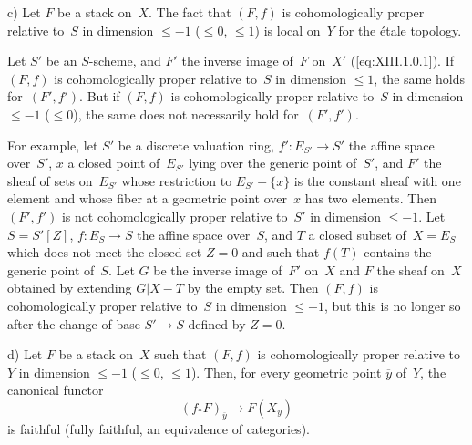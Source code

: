 \begin{remarks}
c) Let $F$ be a stack on~$X$. The fact that $(F,f)$ is
cohomologically proper relative to~$S$ in dimension
$\leqslant -1$ (\resp $\leqslant 0$, \resp $\leqslant 1$) is local
on~$Y$ for the \'etale topology.

Let $S'$ be an $S$-scheme, and $F'$ the inverse image of~$F$ on~$X'$
(\cf \eqref{eq:XIII.1.0.1}). If $(F,f)$ is cohomologically proper
relative to~$S$ in dimension $\leqslant 1$, the same holds
for~$(F', f')$. But if $(F,f)$ is cohomologically proper
relative to~$S$ in dimension $\leqslant -1$ (\resp $\leqslant
0$), the same does not necessarily hold for~$(F', f')$.

For example, let $S'$ be a discrete valuation ring, $f' \colon
E_{S'} \to S'$ the affine space over~$S'$, $x$ a closed
point of~$E_{S'}$ lying over the generic point of~$S'$, and
$F'$ the sheaf of sets on~$E_{S'}$ whose restriction to
$E_{S'}-\{x\}$ is the constant sheaf with one element and
whose fiber at a geometric point over~$x$ has two
elements. Then $(F',f')$ is not cohomologically proper
relative to~$S'$ in dimension $\leqslant -1$. Let $S =
S'[Z]$, $f \colon E_S \to S$ the affine space over~$S$, and $T$ a
closed subset of~$X = E_S$ which does not meet the closed set $Z=0$ and
such that $f(T)$ contains the generic point of~$S$. Let
$G$ be the inverse image of~$F'$ on~$X$ and $F$ the sheaf on~$X$ obtained
by extending $G|X-T$ by the empty set. Then $(F,f)$ is
cohomologically proper relative to~$S$ in dimension
$\leqslant -1$, but this is no longer so after the
change of base $S' \to S$ defined by $Z=0$.


d)
Let $F$ be a stack on~$X$ such that $(F,f)$ is cohomologically
proper relative to $Y$ in dimension $\leqslant -1$ (\resp $\leqslant 0$, \resp $\leqslant 1$). Then, for every
geometric point $\overline{y}$ of~$Y$, the canonical functor
$$
(f_* F)_{\overline{y}} \to F(X_{\overline{y}})
$$
is faithful (\resp fully faithful, \resp an equivalence
of categories).
\end{remarks}

